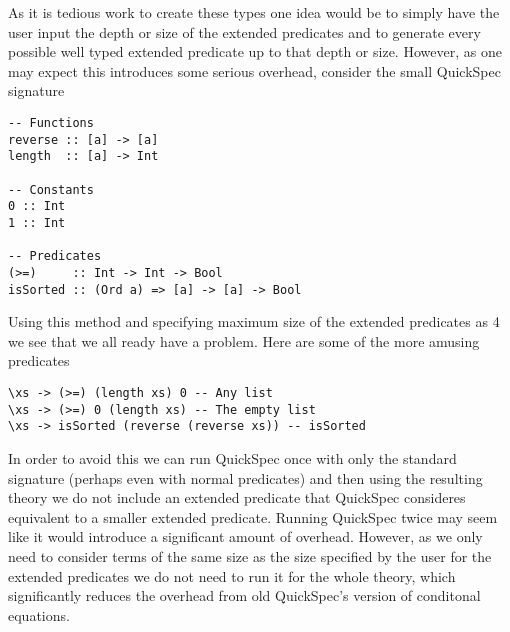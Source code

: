 As it is tedious work to create these types one idea would be to
simply have the user input the depth or size
of the extended predicates and to generate every possible well typed
extended predicate up to that depth or size. However, as one may expect
this introduces some serious overhead, consider the small QuickSpec signature
\begin{verbatim}
-- Functions
reverse :: [a] -> [a]
length  :: [a] -> Int

-- Constants
0 :: Int
1 :: Int

-- Predicates
(>=)     :: Int -> Int -> Bool 
isSorted :: (Ord a) => [a] -> [a] -> Bool
\end{verbatim}
Using this method and specifying maximum size of the extended predicates as 4
we see that we all ready have a problem. Here are some of the more amusing predicates
\begin{verbatim}
\xs -> (>=) (length xs) 0 -- Any list
\xs -> (>=) 0 (length xs) -- The empty list
\xs -> isSorted (reverse (reverse xs)) -- isSorted
\end{verbatim}
In order to avoid this we can run QuickSpec once with only the standard signature (perhaps even with
normal predicates) and then using the resulting theory we do not include an extended predicate
that QuickSpec consideres equivalent to a smaller extended predicate.
Running QuickSpec twice may seem like it would introduce a significant amount of overhead. However,
as we only need to consider terms of the same size as the size specified by the user for the
extended predicates we do not need to run it for the whole theory, which significantly reduces the overhead
from old QuickSpec's version of conditonal equations.
